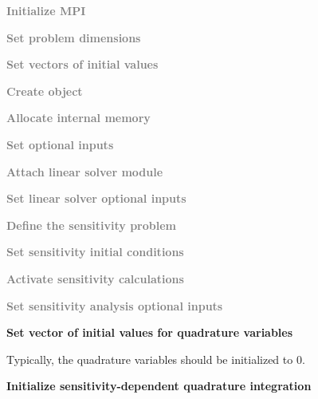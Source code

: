 \begin{Steps}
  
\item 
  \textcolor{gray}{\bf {\p} Initialize MPI}

\item
  \textcolor{gray}{\bf Set problem dimensions}


  
\item
  \textcolor{gray}{\bf Set vectors of initial values}
 
\item
  \textcolor{gray}{\bf Create {\idas} object}

\item
  \textcolor{gray}{\bf Allocate internal memory}

\item
  \textcolor{gray}{\bf Set optional inputs}

\item
  \textcolor{gray}{\bf Attach linear solver module}

\item
  \textcolor{gray}{\bf Set linear solver optional inputs}

\item\label{i:quad_sens_sens_def}
  \textcolor{gray}{\bf Define the sensitivity problem}

\item
  \textcolor{gray}{\bf Set sensitivity initial conditions}

\item
  \textcolor{gray}{\bf Activate sensitivity calculations}

\item
  \textcolor{gray}{\bf Set sensitivity analysis optional inputs}

\item
  {\bf Set vector of initial values for quadrature variables}

  Typically, the quadrature variables should be initialized to $0$.

\item\label{i:quad_sens_init}
  {\bf Initialize sensitivity-dependent quadrature integration}


\end{Steps}
